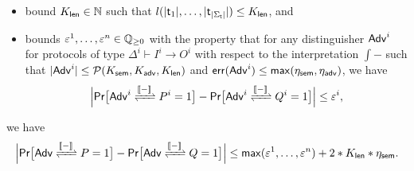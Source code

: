 \begin{lemma}
\begin{itemize}
\item bound $K_{\mathsf{len}} \in \mathbb{N}$ such that $l(|\mathsf{t}_1|,\ldots,|\mathsf{t}_{|\Sigma_\mathsf{t}|}|) \leq K_{\mathsf{len}}$, and

\item bounds $\varepsilon^1,\ldots,\varepsilon^n \in \mathbb{Q}_{\geq 0}$ with the property that for any distinguisher $\mathsf{Adv}^i$ for protocols of type $\Delta^i \vdash I^i \to O^i$ with respect to the interpretation $\int{-}$ such that $|\mathsf{Adv}^i| \leq \mathcal{P}(K_{\mathsf{sem}},K_{\mathsf{adv}},K_{\mathsf{len}})$ and $\mathsf{err}(\mathsf{Adv}^i) \leq \mathsf{max}(\eta_{\mathsf{sem}},\eta_{\mathsf{adv}})$, we have
\[\Big|\mathsf{Pr}\big[\interaction{\Adv^i}{P^i}{\int{-}} = 1\big] - \mathsf{Pr}\big[\interaction{\Adv^i}{Q^i}{\int{-}} = 1\big]\Big| \leq \varepsilon^i,\]
\end{itemize}
we have
\[\Big|\mathsf{Pr}\big[\interaction{\Adv}{P}{\int{-}} = 1\big] - \mathsf{Pr}\big[\interaction{\Adv}{Q}{\int{-}} = 1\big]\Big| \leq \max(\varepsilon^1,\ldots,\varepsilon^n) + 2 * K_\length * \eta_\sem.\]
\end{lemma}

